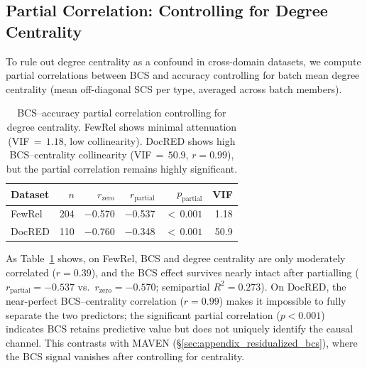 \documentclass[11pt]{article}
\begin{document}
\subsection{Partial Correlation: Controlling for Degree Centrality}
\label{sec:appendix_partial_corr}

To rule out degree centrality as a confound in cross-domain datasets, we compute partial correlations between BCS and accuracy controlling for batch mean degree centrality (mean off-diagonal SCS per type, averaged across batch members).

\begin{table}[h]
\centering
\small
\caption{BCS--accuracy partial correlation controlling for degree centrality. FewRel shows minimal attenuation (VIF${}\,=\,1.18$, low collinearity). DocRED shows high BCS--centrality collinearity (VIF${}\,=\,50.9$, $r = 0.99$), but the partial correlation remains highly significant.}
\label{tab:partial_corr}
\begin{tabular}{lrrrrr}
\toprule
\textbf{Dataset} & \textbf{$n$} & \textbf{$r_{\text{zero}}$} & \textbf{$r_{\text{partial}}$} & \textbf{$p_{\text{partial}}$} & \textbf{VIF} \\
\midrule
FewRel & 204 & $-$0.570 & $-$0.537 & ${<}\,0.001$ & 1.18 \\
DocRED & 110 & $-$0.760 & $-$0.348 & ${<}\,0.001$ & 50.9 \\
\bottomrule
\end{tabular}
\end{table}

As Table~\ref{tab:partial_corr} shows, on FewRel, BCS and degree centrality are only moderately correlated ($r = 0.39$), and the BCS effect survives nearly intact after partialling ($r_{\text{partial}} = -0.537$ vs.\ $r_{\text{zero}} = -0.570$; semipartial $R^2 = 0.273$). On DocRED, the near-perfect BCS--centrality correlation ($r = 0.99$) makes it impossible to fully separate the two predictors; the significant partial correlation ($p < 0.001$) indicates BCS retains predictive value but does not uniquely identify the causal channel. This contrasts with MAVEN (\S\ref{sec:appendix_residualized_bcs}), where the BCS signal vanishes after controlling for centrality.
\end{document}
